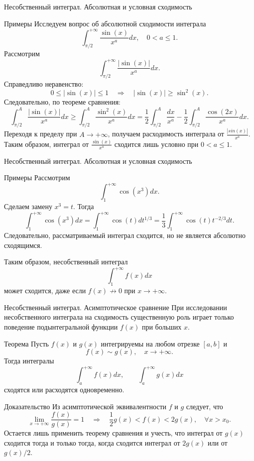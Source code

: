 \documentclass[8pt]{beamer}
\begin{document}
\begin{frame}{Несобственный интеграл. Абсолютная и условная сходимость}
\begin{block}{Примеры}
Исследуем вопрос об абсолютной сходимости интеграла
$$\int_{\pi/2}^{+\infty} \frac{\sin(x)}{x^a}dx, \quad 0<a\le 1.$$
Рассмотрим
$$\int_{\pi/2}^{+\infty} \frac{|\sin(x)|}{x^a}dx.$$
Справедливо неравенство:
$$0\le |\sin(x)|\le 1\quad \Rightarrow \quad |\sin(x)|\ge \sin^2(x).$$
Следовательно, по теореме сравнения:
$$\int_{\pi/2}^{A} \frac{|\sin(x)|}{x^a}dx\ge \int_{\pi/2}^{A} \frac{\sin^2(x)}{x^a}dx =\frac{1}{2} \int_{\pi/2}^{A} \frac{dx}{x^a} - \frac{1}{2}\int_{\pi/2}^A \frac{\cos(2x)}{x^a}dx.$$
Переходя к пределу при $A\to+\infty$, получаем расходимость интеграла от $\displaystyle \frac{|sin(x)|}{x^a}$. Таким образом, интеграл от $\displaystyle \frac{\sin(x)}{x^a}$ сходится лишь условно при $0<a\le1$.
\end{block}
\end{frame}

\begin{frame}{Несобственный интеграл. Абсолютная и условная сходимость}
\begin{block}{Примеры}
Рассмотрим
$$\int_1^{+\infty} \cos(x^3)dx.$$
Сделаем замену $x^3=t$. Тогда
$$\int_1^{+\infty} \cos(x^3)dx = \int_{1}^{+\infty} \cos(t)dt^{1/3} =  \frac{1}{3}\int_{1}^{+\infty} \cos(t) t^{-2/3}dt.$$
Следовательно, рассматриваемый интеграл сходится, но не является абсолютно сходящимся.
\end{block}
Таким образом, несобственный интеграл
$$\int_1^{+\infty} f(x)dx$$
может сходится, даже если $f(x)\not\to 0$ при $x\to+\infty$. 
\end{frame}

\begin{frame}{Несобственный интеграл. Асимптотическое сравнение}
При исследовании несобственного интеграла на сходимость существенную роль играет только поведение подынтегральной функции $f(x)$ при больших $x$.
\begin{block}{Теорема}
Пусть $f(x)$ и $g(x)$ интегрируемы на любом отрезке $[a,b]$ и
$$f(x) \sim g(x),\quad x\to+\infty.$$
Тогда интегралы
$$\int_a^{+\infty} f(x) dx,\qquad \int_a^{+\infty}g(x)dx$$
сходятся или расходятся одновременно. 
\end{block}
\begin{block}{Доказательство}
Из асимптотической эквивалентности $f$ и $g$ следует, что
$$\lim_{x\to+\infty} \frac{f(x)}{g(x)} = 1 \quad \Rightarrow \quad 
\frac{1}{2}g(x)<f(x)<2g(x), \quad \forall x>x_0.$$
Остается лишь применить теорему сравнения и учесть, что интеграл от $g(x)$ сходится тогда и только тогда, когда сходится интеграл от $2 g(x)$ или от $g(x)/2$.
\end{block}
\end{frame}
\end{document}
